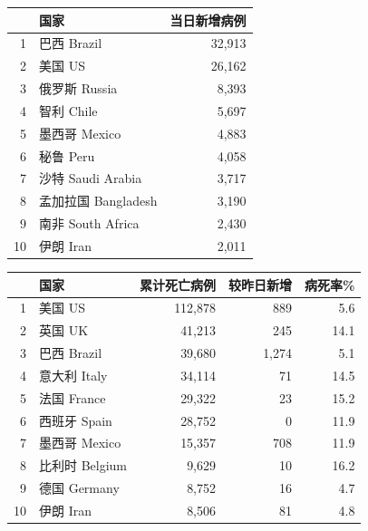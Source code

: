 \documentclass[
]{article}
\begin{document}
\begin{table}[H]
    \begin{minipage}{.4\linewidth}
    \centering
    \captionsetup{justification=centering}
    \caption{日新增病例前十位国家}
    \vspace{-0.5\baselineskip}
      \centering
    \captionsetup{justification=centering} \begin{table}[H]
\centering
\begin{tabular}{rlr}
\toprule
  & 国家 & 当日新增病例\\
\midrule
\rowcolor{gray!6}  1 & 巴西 Brazil & 32,913\\
2 & 美国 US & 26,162\\
\rowcolor{gray!6}  3 & 俄罗斯 Russia & 8,393\\
4 & 智利 Chile & 5,697\\
\rowcolor{gray!6}  5 & 墨西哥 Mexico & 4,883\\
6 & 秘鲁 Peru & 4,058\\
\rowcolor{gray!6}  7 & 沙特 Saudi Arabia & 3,717\\
8 & 孟加拉国 Bangladesh & 3,190\\
\rowcolor{gray!6}  9 & 南非 South Africa & 2,430\\
10 & 伊朗 Iran & 2,011\\
\bottomrule
\end{tabular}
\end{table} \end{minipage}
    \begin{minipage}{.6\linewidth}
    \centering
    \captionsetup{justification=centering}
     \caption{累计死亡病例前十位国家}
     \vspace{-0.5\baselineskip}
      \centering
    \captionsetup{justification=centering} \begin{table}[H]
\centering
\begin{tabular}{rlrrr}
\toprule
  & 国家 & 累计死亡病例 & 较昨日新增 & 病死率\%\\
\midrule
\rowcolor{gray!6}  1 & 美国 US & 112,878 & 889 & 5.6\\
2 & 英国 UK & 41,213 & 245 & 14.1\\
\rowcolor{gray!6}  3 & 巴西 Brazil & 39,680 & 1,274 & 5.1\\
4 & 意大利 Italy & 34,114 & 71 & 14.5\\
\rowcolor{gray!6}  5 & 法国 France & 29,322 & 23 & 15.2\\
6 & 西班牙 Spain & 28,752 & 0 & 11.9\\
\rowcolor{gray!6}  7 & 墨西哥 Mexico & 15,357 & 708 & 11.9\\
8 & 比利时 Belgium & 9,629 & 10 & 16.2\\
\rowcolor{gray!6}  9 & 德国 Germany & 8,752 & 16 & 4.7\\
10 & 伊朗 Iran & 8,506 & 81 & 4.8\\
\bottomrule
\end{tabular}
\end{table} \end{minipage} 
\end{table}
\end{document}
